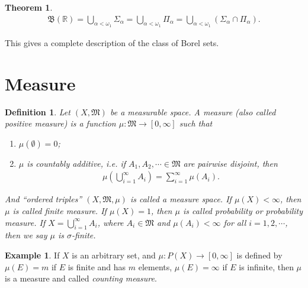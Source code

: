 \documentclass[11pt]{book}
\newtheorem{definition}{Definition}[chapter]
\newtheorem{theorem}{Theorem}[chapter]
\theoremstyle{definition}
\newtheorem{example}{Example}[chapter]
\numberwithin{equation}{chapter}
\def\MM{\mathfrak{M}}
\begin{document}
\medskip



\medskip

\begin{theorem}
\begin{align*}
    \mathfrak{B}(\mathbb{R}) = \bigcup_{\alpha<\omega_1} \Sigma_\alpha = \bigcup_{\alpha<\omega_1} \Pi_\alpha = \bigcup_{\alpha<\omega_1} \left(\Sigma_\alpha \cap \Pi_\alpha\right).
\end{align*}
\end{theorem}

\medskip

This gives a complete description of the class of Borel sets.

\medskip

\section{Measure}

\begin{definition}\label{def_15}
Let $(X, \MM)$ be a measurable space. A measure (also called positive measure) is a function $\mu: \MM \to [0,\infty]$ such that
\begin{enumerate}[label=(\alph*)]
    \item $\mu(\emptyset) = 0$;
    
    \item $\mu$ is countably additive, i.e. if $A_1, A_2, \cdots \in \MM$ are pairwise disjoint, then
    \begin{align*}
        \mu \left( \bigcup^\infty_{i=1} A_i \right) = \sum^\infty_{i=1} \mu(A_i).
    \end{align*}
\end{enumerate}
And ``ordered triples'' $(X, \MM, \mu)$ is called a measure space. If $\mu(X) < \infty$, then $\mu$ is called finite measure. If $\mu(X) = 1$, then $\mu$ is called probability or probability measure. If $X = \bigcup^\infty_{i=1} A_i$, where $A_i \in \MM$ and $\mu(A_i) < \infty$ for all $i = 1,2,\cdots$, then we say $\mu$ is $\sigma$-finite. 
\end{definition}

\medskip

\begin{example}
If $X$ is an arbitrary set, and $\mu: P(X) \to [0,\infty]$ is defined by $\mu(E) = m$ if $E$ is finite and has $m$ elements, $\mu(E) = \infty$ if $E$ is infinite, then $\mu$ is a measure and called {\em counting measure}.
\end{example}
\end{document}
